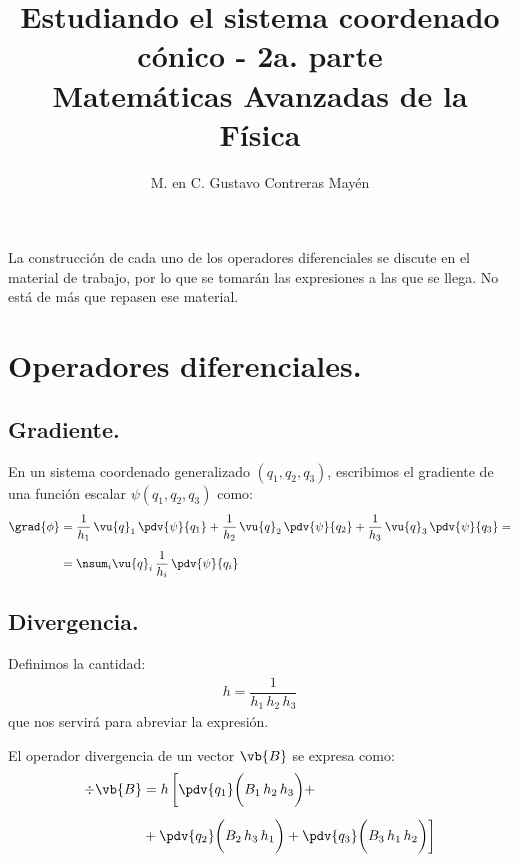 
\title{Estudiando el sistema coordenado cónico - 2a. parte \\[0.3em]  \large{Matemáticas Avanzadas de la Física}\vspace{-3ex}}
\author{M. en C. Gustavo Contreras Mayén}
\date{ }


\vspace{-4cm}
\maketitle
\fontsize{14}{14}\selectfont
\tableofcontents
\newpage

La construcción de cada uno de los operadores diferenciales se discute en el material de trabajo, por lo que se tomarán las expresiones a las que se llega. No está de más que repasen ese material.

\section{Operadores diferenciales.}

\subsection{Gradiente.}

En un sistema coordenado generalizado $(q_{1}, q_{2}, q_{3})$, escribimos el gradiente de una función escalar $\psi (q_{1}, q_{2}, q_{3})$ como:
\begin{align*}
\grad{\phi} &= \dfrac{1}{h_{1}} \, \vu{q}_{1} \, \pdv{\psi}{q_{1}} + \dfrac{1}{h_{2}} \, \vu{q}_{2} \, \pdv{\psi}{q_{2}} + \dfrac{1}{h_{3}} \, \vu{q}_{3} \, \pdv{\psi}{q_{3}} = \\[0.5em] 
&= \nsum_{i} \vu{q}_{i} \, \dfrac{1}{h_{i}} \, \pdv{\psi}{q_{i}}
\end{align*}

\subsection{Divergencia.}

Definimos la cantidad:
\begin{align*}
h = \dfrac{1}{h_{1} \, h_{2} \, h_{3}}
\end{align*}
que nos servirá para abreviar la expresión.

El operador divergencia de un vector $\vb{B}$ se expresa como:
\begin{align*}
\div{\vb{B}} &= h \, \bigg[ \pdv{q_{1}} \bigg( B_{1} \, h_{2} \, h_{3} \bigg) + \\[0.5em]
&+ \pdv{q_{2}} \bigg( B_{2} \, h_{3} \, h_{1} \bigg) + \pdv{q_{3}} \bigg( B_{3} \, h_{1} \, h_{2} \bigg) \bigg]
\end{align*}

